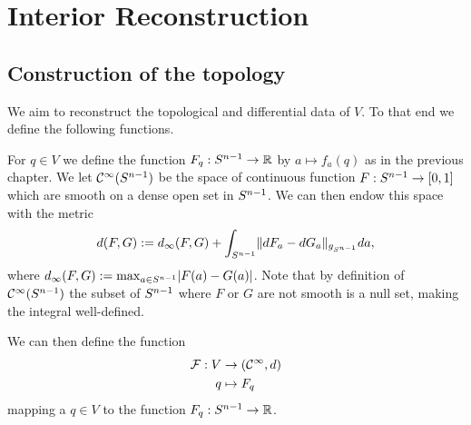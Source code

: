 \chapter{Interior Reconstruction}

\section{Construction of the topology}
We aim to reconstruct the topological and differential data of $V$. To that end we define the following functions.

For $q\in V$ we define the function $F_q:{S^{n-1}}\to\mathbb{R}$ by $a\mapsto f_a(q)$ as in the previous chapter. We let ${\mathcal{C}}^\infty({S^{n-1}})$ be the space of continuous function $F:{S^{n-1}}\to [0,1]$ which are smooth on a dense open set in ${S^{n-1}}$. We can then endow this space with the metric 
\[
    d(F,G):= d_\infty(F,G) + \int_{{S^{n-1}}} \lVert dF_a - dG_a \rVert_{g_{S^{n-1}}}da,
\] where $d_\infty(F,G):=\max_{a\in {S^{n-1}}}\lvert F(a)-G(a)\rvert$.
Note that by definition of ${\mathcal{C}}^\infty({S^{n-1}})$ the subset of ${S^{n-1}}$ where $F$ or $G$ are not smooth is a null set, making the integral well-defined.

We can then define the function 
\begin{align*}
    \mathcal{F}:V &\to ({\mathcal{C}}^\infty, d)\\
    q&\mapsto F_q
\end{align*} mapping a $q\in V$ to the function $F_q:{S^{n-1}}\to\mathbb{R}$. 

